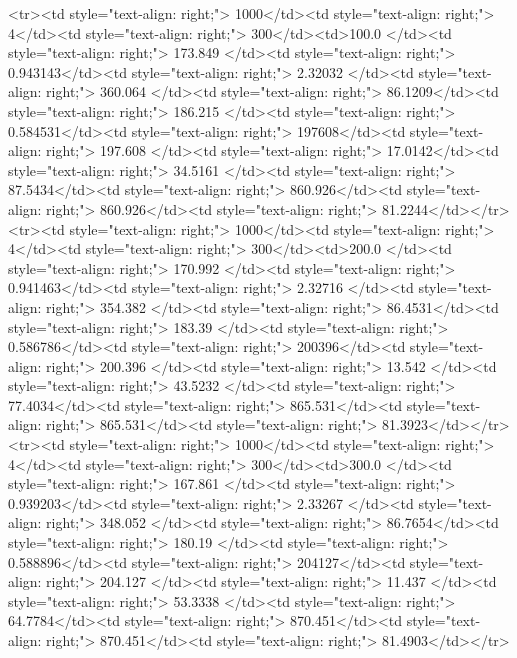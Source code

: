 <tr><td style="text-align: right;">      1000</td><td style="text-align: right;">         4</td><td style="text-align: right;">           300</td><td>100.0        </td><td style="text-align: right;">               173.849 </td><td style="text-align: right;">           0.943143</td><td style="text-align: right;">         2.32032 </td><td style="text-align: right;">        360.064 </td><td style="text-align: right;">            86.1209</td><td style="text-align: right;">             186.215   </td><td style="text-align: right;">             0.584531</td><td style="text-align: right;">              197608</td><td style="text-align: right;">                      197.608 </td><td style="text-align: right;">            17.0142</td><td style="text-align: right;">                34.5161 </td><td style="text-align: right;">        87.5434</td><td style="text-align: right;">    860.926</td><td style="text-align: right;">       860.926</td><td style="text-align: right;">                 81.2244</td></tr>
<tr><td style="text-align: right;">      1000</td><td style="text-align: right;">         4</td><td style="text-align: right;">           300</td><td>200.0        </td><td style="text-align: right;">               170.992 </td><td style="text-align: right;">           0.941463</td><td style="text-align: right;">         2.32716 </td><td style="text-align: right;">        354.382 </td><td style="text-align: right;">            86.4531</td><td style="text-align: right;">             183.39    </td><td style="text-align: right;">             0.586786</td><td style="text-align: right;">              200396</td><td style="text-align: right;">                      200.396 </td><td style="text-align: right;">            13.542 </td><td style="text-align: right;">                43.5232 </td><td style="text-align: right;">        77.4034</td><td style="text-align: right;">    865.531</td><td style="text-align: right;">       865.531</td><td style="text-align: right;">                 81.3923</td></tr>
<tr><td style="text-align: right;">      1000</td><td style="text-align: right;">         4</td><td style="text-align: right;">           300</td><td>300.0        </td><td style="text-align: right;">               167.861 </td><td style="text-align: right;">           0.939203</td><td style="text-align: right;">         2.33267 </td><td style="text-align: right;">        348.052 </td><td style="text-align: right;">            86.7654</td><td style="text-align: right;">             180.19    </td><td style="text-align: right;">             0.588896</td><td style="text-align: right;">              204127</td><td style="text-align: right;">                      204.127 </td><td style="text-align: right;">            11.437 </td><td style="text-align: right;">                53.3338 </td><td style="text-align: right;">        64.7784</td><td style="text-align: right;">    870.451</td><td style="text-align: right;">       870.451</td><td style="text-align: right;">                 81.4903</td></tr>
